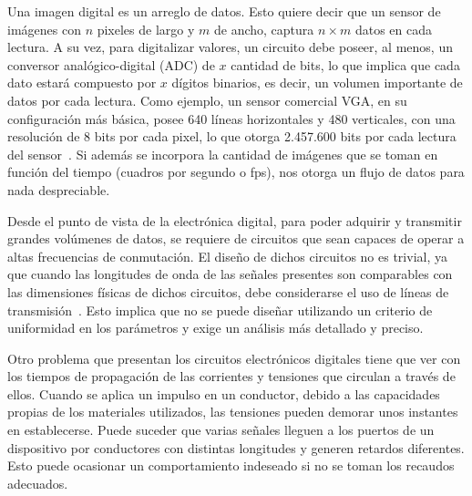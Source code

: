 Una imagen digital es un arreglo de datos. Esto quiere decir que un sensor de imágenes con $n$ pixeles de largo y $m$ de ancho, captura $n\times m$ datos en cada lectura. A su vez, para digitalizar valores, un circuito debe poseer, al menos, un conversor analógico-digital (ADC) de $x$ cantidad de bits, lo que implica que cada dato estará compuesto por $x$ dígitos binarios, es decir, un volumen importante de datos por cada lectura. Como ejemplo, un sensor comercial VGA, en su configuración más básica, posee 640 líneas horizontales y 480 verticales, con una resolución de 8 bits por cada pixel, lo que otorga 2.457.600 bits por cada lectura del sensor~\cite{ONSemiconductor2014}. Si además se incorpora la cantidad de imágenes que se toman en función del tiempo (cuadros por segundo o fps), nos otorga un flujo de datos para nada despreciable.%

Desde el punto de vista de la electrónica digital, para poder adquirir y transmitir grandes volúmenes de datos, se requiere de circuitos que sean capaces de operar a altas frecuencias de conmutación. El diseño de dichos circuitos no es trivial, ya que cuando las longitudes de onda de las señales presentes son comparables con las dimensiones físicas de dichos circuitos, debe considerarse el uso de líneas de transmisión~\cite{Ida2015}. Esto implica que no se puede diseñar utilizando un criterio de uniformidad en los parámetros y exige un análisis más detallado y preciso.%

Otro problema que presentan los circuitos electrónicos digitales tiene que ver con los tiempos de propagación de las corrientes y tensiones que circulan a través de ellos. Cuando se aplica un impulso en un conductor, debido a las capacidades propias de los materiales utilizados, las tensiones pueden demorar unos instantes en establecerse. Puede suceder que varias señales lleguen a los puertos de un dispositivo por conductores con distintas longitudes y generen retardos diferentes. Esto puede ocasionar un comportamiento indeseado si no se toman los recaudos adecuados.%

